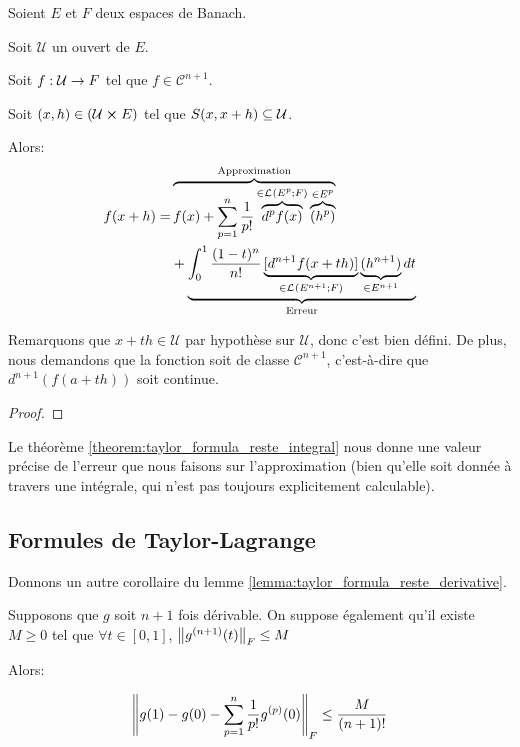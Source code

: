 \begin{theorem} 
	\label{theorem:taylor_formula_reste_integral}
	Soient $E$ et $F$ deux espaces de Banach.

	Soit $\mathcal{U}$ un ouvert de $E$.

	Soit $f : \mathcal{U} \rightarrow F$ tel que $f \in \mathcal{C}^{n + 1}$.

	Soit $(x, h) \in (\mathcal{U} \cross E)$ tel que $S(x, x + h)
	\subseteq \mathcal{U}$.

	Alors:
	\begin{align*}
		f(x + h) = & \overbrace
		{
			f(x) + \displaystyle \sum_{p = 1}^{n} \frac{1}{p!}
			\overbrace{d^{p}f(x)}^{\in \mathcal{L}_{}(E^{p}; F)}
			\overbrace{(h^{p})}^{\in E^{p}}
		}^{\text{Approximation}} \\
		& + \underbrace
		{
			\int_{0}^{1} \frac{(1 - t)^{n}}{n!} \underbrace{[d^{n + 1}f(x +
			th)]}_{\in \mathcal{L}_{}(E^{n+1}; F)} \underbrace{(h^{n+1})}_{\in E^{n +
			1}} dt
		}_{\text{Erreur}}
	\end{align*}

	Remarquons que $x + th \in \mathcal{U}$ par hypothèse sur $\mathcal{U}$,
	donc c'est bien défini. De plus, nous demandons que la fonction soit de
	classe $\mathcal{C}^{n + 1}$, c'est-à-dire que $d^{n + 1}(f(a + th))$ soit
	continue.
\end{theorem}

\ifdefined\outputproof
\begin{proof}

\end{proof}
\fi

Le théorème \ref{theorem:taylor_formula_reste_integral} nous donne une valeur
précise de l'erreur que nous faisons sur l'approximation (bien qu'elle soit
donnée à travers une intégrale, qui n'est pas toujours explicitement
calculable).

\subsection{Formules de Taylor-Lagrange}

Donnons un autre corollaire du lemme
\ref{lemma:taylor_formula_reste_derivative}.

\begin{corollary}
	Supposons que $g$ soit $n + 1$ fois dérivable.
	On suppose également qu'il existe $M \geq 0$ tel que $\forall t \in [0, 1]$,
	$\norm{g^{(n + 1)}(t)}_{F} \leq M$

	Alors:

	\begin{equation*}
		\norm{g(1) - g(0) - \displaystyle \sum_{p = 1}^{n} \frac{1}{p!}
		g^{(p)}(0)}_{F} \leq \frac{M}{(n + 1)!}
	\end{equation*}
\end{corollary}


